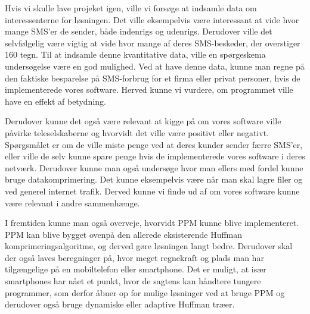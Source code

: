 Hvis vi skulle lave projeket igen, ville vi forsøge at indsamle data om interessenterne for løsningen. Det ville eksempelvis være interessant at vide hvor mange SMS'er de sender, både indenrigs og udenrigs. Derudover ville det selvfølgelig være vigtig at vide hvor mange af deres SMS-beskeder, der overstiger 160 tegn. Til at indsamle denne kvantitative data, ville en spørgeskema undersøgelse være en god mulighed. Ved at have denne data, kunne man regne på den faktiske besparelse på SMS-forbrug for et firma eller privat personer, hvis de implementerede vores software. Herved kunne vi vurdere, om programmet ville have en effekt af betydning. 

Derudover kunne det også være relevant at kigge på om vores software ville påvirke teleselskaberne og hvorvidt det ville være positivt eller negativt. Spørgsmålet er om de ville miste penge ved at deres kunder sender færre SMS'er, eller ville de selv kunne spare penge hvis de implementerede vores software i deres netværk.
Derudover kunne man også undersøge hvor man ellers med fordel kunne bruge datakomprimering. Det kunne eksempelvis være når man skal lagre filer og ved generel internet trafik. Derved kunne vi finde ud af om vores software kunne være relevant i andre sammenhænge.

I fremtiden kunne man også overveje, hvorvidt PPM kunne blive implementeret. PPM kan blive bygget ovenpå den allerede eksisterende Huffman komprimeringsalgoritme, og derved gøre løsningen langt bedre. Derudover skal der også laves beregninger på, hvor meget regnekraft og plads man har tilgængelige på en mobiltelefon eller smartphone. Det er muligt, at især smartphones har nået et punkt, hvor de sagtens kan håndtere tungere programmer, som derfor åbner op for mulige løsninger ved at bruge PPM og derudover også bruge dynamiske eller adaptive Huffman træer.